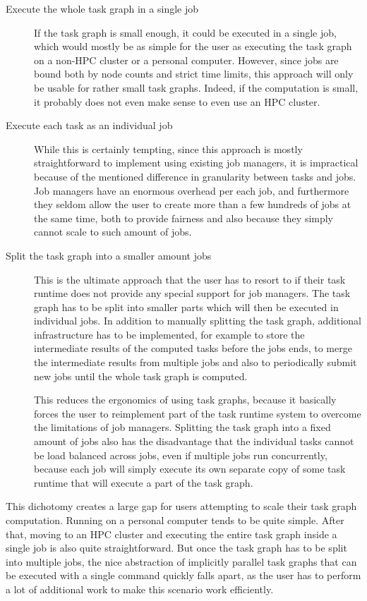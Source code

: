 \begin{description}
    \item[Execute the whole task graph in a single job] If the task graph is small enough, it
    could be executed in a single job, which would mostly be as simple for the user as executing
    the task graph on a non-HPC cluster or a personal computer. However, since jobs are bound
    both by node counts and strict time limits, this approach will only be usable for rather
    small task graphs. Indeed, if the computation is small, it probably does not even make sense
    to even use an HPC cluster.
    \item[Execute each task as an individual job] While this is certainly tempting, since this
    approach is mostly straightforward to implement using existing job managers, it is
    impractical because of the mentioned difference in granularity between tasks and jobs.
    Job managers have an enormous overhead per each job, and furthermore they seldom allow the
    user to create more than a few hundreds of jobs at the same time, both to provide fairness and
    also because they simply cannot scale to such amount of jobs.
    \item[Split the task graph into a smaller amount jobs] This is the ultimate approach that the
    user has to resort to if their task runtime does not provide any special support for job
    managers. The task graph has to be split into smaller parts which will then be executed in
    individual jobs. In addition to manually splitting the task graph, additional infrastructure
    has to be implemented, for example to store the intermediate results of the computed tasks
    before the jobs ends, to merge the intermediate results from multiple jobs and also to
    periodically submit new jobs until the whole task graph is computed.

    This reduces the ergonomics of using task graphs, because it basically forces the user to
    reimplement part of the task runtime system to overcome the limitations of job managers.
    Splitting the task graph into a fixed amount of jobs also has the disadvantage that the
    individual tasks cannot be load balanced across jobs, even if multiple jobs run
    concurrently, because each job will simply execute its own separate copy of some task
    runtime that will execute a part of the task graph.
\end{description}

This dichotomy creates a large gap for users attempting to scale their task graph
computation. Running on a personal computer tends to be quite simple. After that, moving to an
HPC cluster and executing the entire task graph inside a single job is also quite
straightforward. But once the task graph has to be split into multiple jobs, the nice
abstraction of implicitly parallel task graphs that can be executed with a single command
quickly falls apart, as the user has to perform a lot of additional work to make this scenario
work efficiently.


